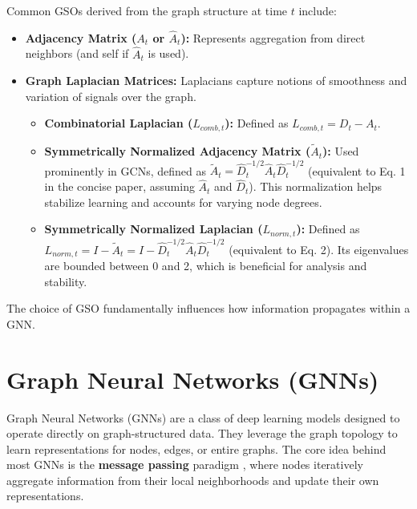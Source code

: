 Common GSOs derived from the graph structure at time $t$ include:
\begin{itemize}
    \item \textbf{Adjacency Matrix ($A_t$ or $\hat{A}_t$):} Represents aggregation from direct neighbors (and self if $\hat{A}_t$ is used).
    \item \textbf{Graph Laplacian Matrices:} Laplacians capture notions of smoothness and variation of signals over the graph.
        \begin{itemize}
            \item \textbf{Combinatorial Laplacian ($L_{comb, t}$):} Defined as $L_{comb, t} = D_t - A_t$.
            \item \textbf{Symmetrically Normalized Adjacency Matrix ($\tilde{A}_t$):} Used prominently in GCNs, defined as $\tilde{A}_t = \hat{D}_t^{-1/2} \hat{A}_t \hat{D}_t^{-1/2}$ (equivalent to Eq. 1 in the concise paper, assuming $\hat{A}_t$ and $\hat{D}_t$). This normalization helps stabilize learning and accounts for varying node degrees.
            \item \textbf{Symmetrically Normalized Laplacian ($L_{norm, t}$):} Defined as $L_{norm, t} = I - \tilde{A}_t = I - \hat{D}_t^{-1/2} \hat{A}_t \hat{D}_t^{-1/2}$ (equivalent to Eq. 2). Its eigenvalues are bounded between 0 and 2, which is beneficial for analysis and stability.
        \end{itemize}
\end{itemize}
The choice of GSO fundamentally influences how information propagates within a GNN.

\section{Graph Neural Networks (GNNs)}
\label{sec:gnns}

Graph Neural Networks (GNNs) are a class of deep learning models designed to operate directly on graph-structured data. They leverage the graph topology to learn representations for nodes, edges, or entire graphs. The core idea behind most GNNs is the \textbf{message passing} paradigm \cite{Gilmer2017MessagePassing}, where nodes iteratively aggregate information from their local neighborhoods and update their own representations.


